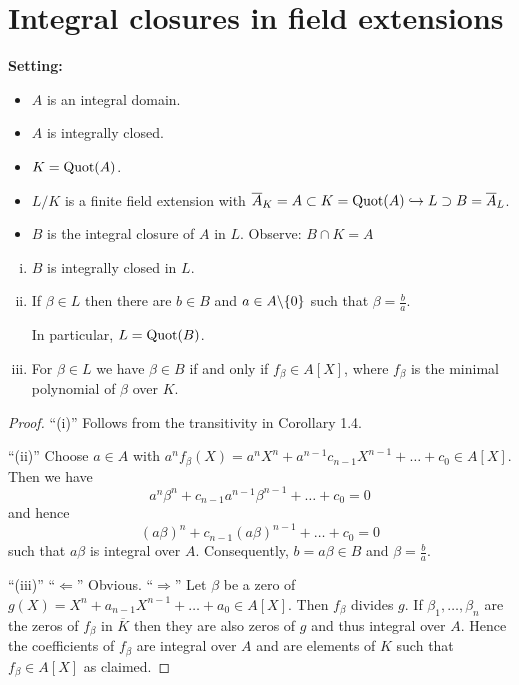 \section{Integral closures in field extensions}

\textbf{Setting:}
\begin{itemize}
\item $A$ is an integral domain.
\item $A$ is integrally closed.
\item $K= \operatorname{Quot}(A)$.
\item $L / K$ is a finite field extension with $\overline{A}_K = A \subset K = \operatorname{Quot}(A) \hookrightarrow L \supset B = \overline{A}_L$.
\item $B$ is the integral closure of $A$ in $L$. Observe: $B \cap K = A$
\end{itemize}

\begin{Bem}
\begin{enumerate}[(i)]
	\item $B$ is integrally closed in $L$.
	\item If $\beta \in L$ then there are $b \in B$ and $a \in A\backslash \{0\}$ such that $\beta = \frac{b}{a}$. 
	
	In particular, $L=\operatorname{Quot}(B)$.
	\item For $\beta\in L$ we have $\beta \in B$ if and only if $f_\beta \in A[X]$, where $f_\beta$ is the minimal polynomial of $\beta$ over $K$.
\end{enumerate}
\end{Bem}

\begin{proof}\enquote{(i)} Follows from the transitivity in Corollary 1.4.
	
	\bigskip \enquote{(ii)} Choose $a\in A$ with $a^n f_\beta(X) = a^n X^n+a^{n-1}c_{n-1}X^{n-1} + \dots + c_0 \in A[X]$.
	Then we have
	\[ a^n \beta^n+c_{n-1}a^{n-1}\beta^{n-1} + \dots + c_0=0
	\]
	and hence
	\[ (a \beta)^n+c_{n-1}(a\beta)^{n-1} + \dots + c_0=0
	\]
	such that $a\beta$ is integral over $A$. Consequently, $b=a \beta \in B$ and $\beta = \frac{b}{a}$.
	
	\bigskip \enquote{(iii)} \enquote{$\Leftarrow$} Obvious. \enquote{$\Rightarrow$} Let $\beta$ be a zero of 
	$g(X)=X^n+a_{n-1}X^{n-1}+\dots + a_0 \in A[X]$. Then $f_\beta$ divides $g$.
	If $\beta_1,\dots, \beta_n$ are the zeros of $f_\beta$ in $\overline{K}$ then they are also zeros of $g$ and thus integral over $A$. Hence the coefficients of $f_\beta$ are integral over $A$ and are elements of $K$ such that $f_\beta \in A[X]$ as claimed.
\end{proof}